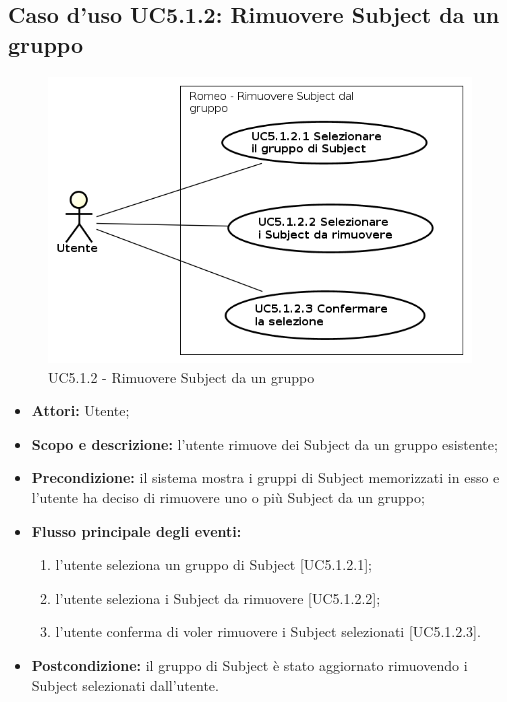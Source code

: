 \subsection{Caso d'uso UC5.1.2: Rimuovere Subject da un gruppo}
\begin{figure}[!h]
\begin{center}
\includegraphics[scale=0.6]{./img/Use_Case/UC5_1_2}
\caption{UC5.1.2 - Rimuovere Subject da un gruppo}
\end{center}
\end{figure}
\begin{itemize}
\item \textbf{Attori:} Utente;
\item \textbf{Scopo e descrizione:} l'utente rimuove dei Subject\glossario{} da un gruppo esistente;
\item \textbf{Precondizione:} il sistema mostra i gruppi di Subject\glossario{} memorizzati in esso e l'utente ha deciso di rimuovere uno o più Subject\glossario{} da un gruppo;
\item \textbf{Flusso principale degli eventi:}
\begin{enumerate}
\item l'utente seleziona un gruppo di Subject\glossario{} [UC5.1.2.1];
\item l'utente seleziona i Subject\glossario{} da rimuovere [UC5.1.2.2];
\item l'utente conferma di voler rimuovere i Subject\glossario{} selezionati [UC5.1.2.3].
\end{enumerate}
\item \textbf{Postcondizione:} il gruppo di Subject\glossario{} è stato aggiornato rimuovendo i Subject\glossario{} selezionati dall'utente.
\end{itemize}


